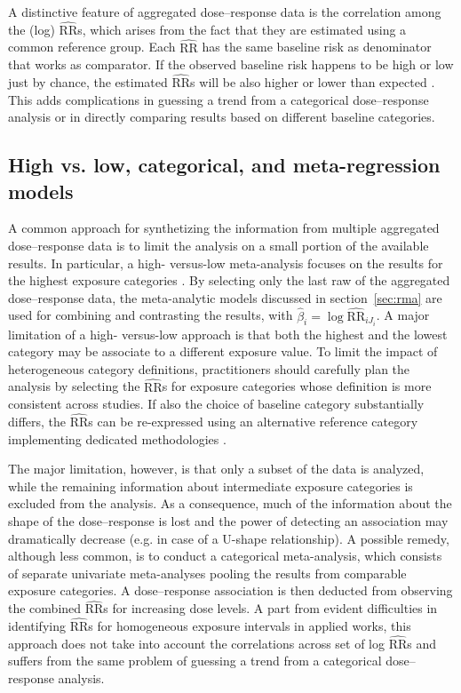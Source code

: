 \documentclass[11pt,a4paper,twoside,openany]{book}\usepackage{knitr}
\begin{document}
{A distinctive feature of aggregated dose--response data is the correlation among the (log) $\widehat{\mathrm{RR}}$s, which arises from the fact that they are estimated using a common reference group. Each $\widehat{\mathrm{RR}}$ has the same baseline risk as denominator that works as comparator. If the observed baseline risk happens to be high or low just by chance, the estimated $\widehat{\mathrm{RR}}$s will be also higher or lower than expected \citep{schmid1998empirical}. This adds complications in guessing a trend from a categorical dose--response analysis or in directly comparing results based on different baseline categories. 

\subsection{High vs. low, categorical, and meta-regression models}

A common approach for synthetizing the information from multiple aggregated dose--response data is to limit the analysis on a small portion of the available results. In particular, a high- versus-low meta-analysis focuses on the results for the highest exposure categories \citep{yu2013empirical}. By selecting only the last raw of the aggregated dose--response data, the meta-analytic models discussed in section~\ref{sec:rma} are used for combining and contrasting the results, with $\hat \beta_i = \log \widehat{\mathrm{RR}}_{iJ_i}$. 
A major limitation of a high- versus-low approach is that both the highest and the lowest category may be associate to a different exposure value. To limit the impact of heterogeneous category definitions, practitioners should carefully plan the analysis by selecting the $\widehat{\mathrm{RR}}$s for exposure categories whose definition is more consistent across studies. If also the choice of baseline category substantially differs, the $\widehat{\mathrm{RR}}$s can be re-expressed using an alternative reference category implementing dedicated methodologies \cite{hamling2008facilitating}.

The major limitation, however, is that only a subset of the data is analyzed, while the remaining information about intermediate exposure categories is excluded from the analysis. As a consequence, much of the information about the shape of the dose--response is lost and the power of detecting an association may dramatically decrease (e.g. in case of a U-shape relationship). A possible remedy, although less common, is to conduct a categorical meta-analysis, which consists of separate univariate meta-analyses pooling the results from comparable exposure categories. A dose--response association is then deducted from observing the combined $\widehat{\mathrm{RR}}$s for increasing dose levels. A part from evident difficulties in identifying $\widehat{\mathrm{RR}}$s for homogeneous exposure intervals in applied works, this approach does not take into account the correlations across set of log $\widehat{\mathrm{RR}}$s and suffers from the same problem of guessing a trend from a categorical dose--response analysis. 

}
\end{document}
